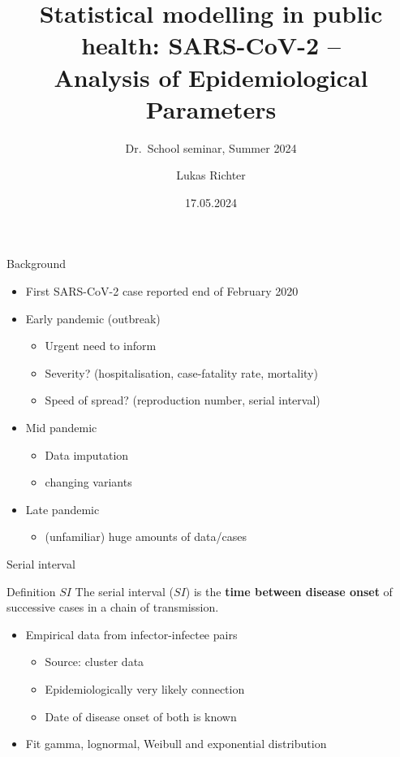 \documentclass[
  ignorenonframetext,
  aspectratio=169,
]{beamer}
\title{Statistical modelling in public health: SARS-CoV-2 --\\
Analysis of Epidemiological Parameters}
\subtitle{Dr.~School seminar, Summer 2024}
\author{Lukas Richter}
\date{17.05.2024}
\providecommand{\tightlist}{%
  \setlength{\itemsep}{0pt}\setlength{\parskip}{0pt}}
\begin{document}
\frame{\titlepage}

\begin{frame}{Background}
\protect\hypertarget{background}{}
\begin{itemize}
\tightlist
\item
  First SARS-CoV-2 case reported end of February 2020
\item
  Early pandemic (outbreak)

  \begin{itemize}
  \tightlist
  \item
    Urgent need to inform
  \item
    Severity? (hospitalisation, case-fatality rate, mortality)
  \item
    Speed of spread? (reproduction number, serial interval)
  \end{itemize}
\item
  Mid pandemic

  \begin{itemize}
  \tightlist
  \item
    Data imputation
  \item
    changing variants
  \end{itemize}
\item
  Late pandemic

  \begin{itemize}
  \tightlist
  \item
    (unfamiliar) huge amounts of data/cases
  \end{itemize}
\end{itemize}
\end{frame}

\begin{frame}{Serial interval}
\protect\hypertarget{serial-interval}{}
\begin{block}{Definition $SI$}
The serial interval ($SI$) is the \textbf{time between disease onset} of successive cases in a chain of transmission.
\end{block}

\pause

\begin{itemize}
\item Empirical data from infector-infectee pairs
\begin{itemize}
\item Source: cluster data
\item Epidemiologically very likely connection
\item Date of disease onset of both is known
\end{itemize}
\item Fit gamma, lognormal, Weibull and exponential distribution
\end{itemize}
\end{frame}
\end{document}
